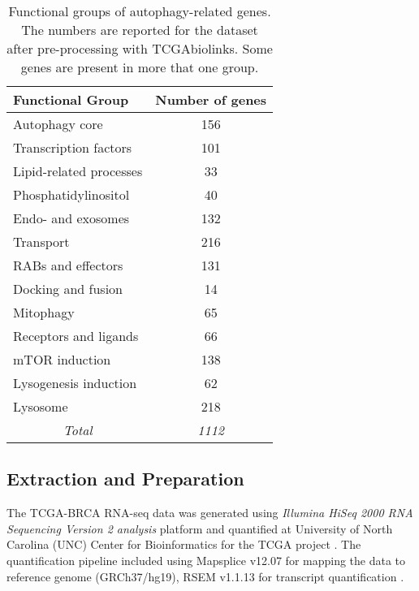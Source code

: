     
            \begin{table}[!htbp]
            \centering
            \caption[Functional groups of autophagy-related genes]{Functional groups of autophagy-related genes. The numbers are reported for the dataset after pre-processing with TCGAbiolinks. Some genes are present in more that one group. }
            \label{table:autophagy}
            \begin{tabular}{l|c}
            \small
            \textbf{Functional Group} & \multicolumn{1}{l}{\textbf{Number of genes}} \\ \hline
            Autophagy core & 156 \\ \hline
            Transcription factors & 101 \\ \hline
            Lipid-related processes & 33 \\ \hline
            Phosphatidylinositol & 40 \\ \hline
            Endo- and exosomes & 132 \\ \hline
            Transport & 216 \\ \hline
            RABs and effectors & 131 \\ \hline
            Docking and fusion & 14 \\ \hline
            Mitophagy & 65 \\ \hline
            Receptors and ligands & 66 \\ \hline
            mTOR induction & 138 \\ \hline
            Lysogenesis induction & 62 \\ \hline
            Lysosome & 218 \\ \hline
            \multicolumn{1}{c|}{\textit{Total}} & \textit{1112}
            \end{tabular}
            \end{table}
            
            
            
            
    \subsection{Extraction and Preparation}
    
    The TCGA-BRCA RNA-seq data was generated using \textit{Illumina HiSeq 2000 RNA Sequencing Version 2 analysis} platform and quantified at University of North Carolina (UNC) Center for Bioinformatics for the TCGA project \cite{UniversityofNorthCarolinaUNCCenterforBioinfromatics2013TCGAData}. The quantification pipeline included  using Mapsplice v12.07 \cite{wang2010mapsplice} for mapping the data to reference genome (GRCh37/hg19), RSEM v1.1.13 \cite{li2011rsem} for transcript quantification \cite{UniversityofNorthCarolinaUNCCenterforBioinfromatics2013TCGAData}. 


